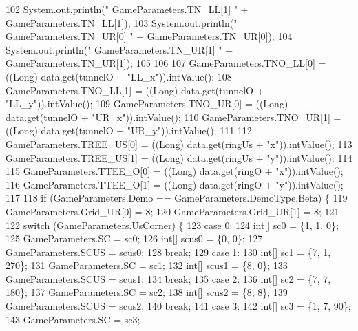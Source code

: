 \begin{DoxyCode}
102       System.out.println(\textcolor{stringliteral}{" GameParameters.TN\_LL[1] "} + GameParameters.TN\_LL[1]);
103       System.out.println(\textcolor{stringliteral}{" GameParameters.TN\_UR[0] "} + GameParameters.TN\_UR[0]);
104       System.out.println(\textcolor{stringliteral}{" GameParameters.TN\_UR[1] "} + GameParameters.TN\_UR[1]);
105 
106 
107       GameParameters.TNO\_LL[0] = ((Long) data.get(tunnelO + \textcolor{stringliteral}{"LL\_x"})).intValue();
108       GameParameters.TNO\_LL[1] = ((Long) data.get(tunnelO + \textcolor{stringliteral}{"LL\_y"})).intValue();
109       GameParameters.TNO\_UR[0] = ((Long) data.get(tunnelO + \textcolor{stringliteral}{"UR\_x"})).intValue();
110       GameParameters.TNO\_UR[1] = ((Long) data.get(tunnelO + \textcolor{stringliteral}{"UR\_y"})).intValue();
111 
112       GameParameters.TREE\_US[0] = ((Long) data.get(ringUs + \textcolor{stringliteral}{"x"})).intValue();
113       GameParameters.TREE\_US[1] = ((Long) data.get(ringUs + \textcolor{stringliteral}{"y"})).intValue();
114 
115       GameParameters.TTEE\_O[0] = ((Long) data.get(ringO + \textcolor{stringliteral}{"x"})).intValue();
116       GameParameters.TTEE\_O[1] = ((Long) data.get(ringO + \textcolor{stringliteral}{"y"})).intValue();
117 
118       \textcolor{keywordflow}{if} (GameParameters.Demo == GameParameters.DemoType.Beta) \{
119         GameParameters.Grid\_UR[0] = 8;
120         GameParameters.Grid\_UR[1] = 8;
121 
122         \textcolor{keywordflow}{switch} (GameParameters.UsCorner) \{
123           \textcolor{keywordflow}{case} 0:
124             \textcolor{keywordtype}{int}[] sc0 = \{1, 1, 0\};
125             GameParameters.SC = sc0;
126             \textcolor{keywordtype}{int}[] scus0 = \{0, 0\};
127             GameParameters.SCUS = scus0;
128             \textcolor{keywordflow}{break};
129           \textcolor{keywordflow}{case} 1:
130             \textcolor{keywordtype}{int}[] sc1 = \{7, 1, 270\};
131             GameParameters.SC = sc1;
132             \textcolor{keywordtype}{int}[] scus1 = \{8, 0\};
133             GameParameters.SCUS = scus1;
134             \textcolor{keywordflow}{break};
135           \textcolor{keywordflow}{case} 2:
136             \textcolor{keywordtype}{int}[] sc2 = \{7, 7, 180\};
137             GameParameters.SC = sc2;
138             \textcolor{keywordtype}{int}[] scus2 = \{8, 8\};
139             GameParameters.SCUS = scus2;
140             \textcolor{keywordflow}{break};
141           \textcolor{keywordflow}{case} 3:
142             \textcolor{keywordtype}{int}[] sc3 = \{1, 7, 90\};
143             GameParameters.SC = sc3;

\end{DoxyCode}
